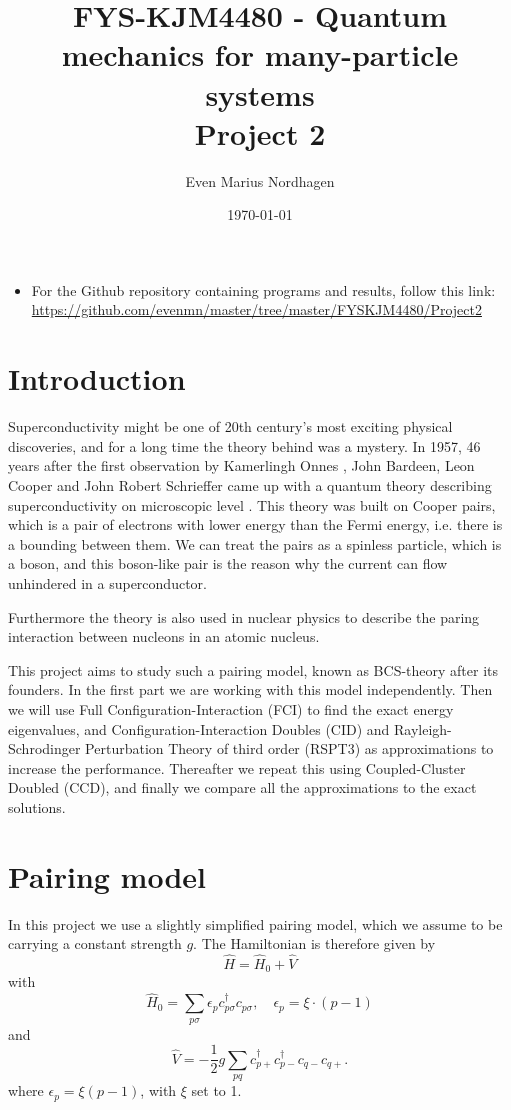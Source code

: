 \documentclass[norsk,a4paper,12pt]{article}
\title{FYS-KJM4480 - Quantum mechanics for many-particle systems \\\vspace{2mm} \Large{Project 2}}
\author{\large Even Marius Nordhagen}
\date\today
\begin{document}
\maketitle

\begin{itemize}
\item For the Github repository containing programs and results, follow this link: 
\url{https://github.com/evenmn/master/tree/master/FYSKJM4480/Project2}
\end{itemize}

\section*{Introduction}
Superconductivity might be one of 20th century's most exciting physical discoveries, and for a long time the theory behind was a mystery. In 1957, 46 years after the first observation by Kamerlingh Onnes \cite {Onnes}, John Bardeen, Leon Cooper and John Robert Schrieffer came up with a quantum theory describing superconductivity on microscopic level \cite {BCS}. This theory was built on Cooper pairs, which is a pair of electrons with lower energy than the Fermi energy, i.e. there is a bounding between them. We can treat the pairs as a spinless particle, which is a boson, and this boson-like pair is the reason why the current can flow unhindered in a superconductor. 

Furthermore the theory is also used in nuclear physics to describe the paring interaction between nucleons in an atomic nucleus. 

This project aims to study such a pairing model, known as BCS-theory after its founders. In the first part we are working with this model independently. Then we will use Full Configuration-Interaction (FCI) to find the exact energy eigenvalues, and Configuration-Interaction Doubles (CID) and Rayleigh-Schrodinger Perturbation Theory of third order (RSPT3) as approximations to increase the performance. Thereafter we repeat this using Coupled-Cluster Doubled (CCD), and finally we compare all the approximations to the exact solutions.
\newpage

\section{Pairing model}
In this project we use a slightly simplified pairing model, which we assume to be carrying a constant strength $g$. The Hamiltonian is therefore given by
\begin{equation}
\hat{H}=\hat{H}_0+\hat{V}
\end{equation}
with
\begin{equation}
\hat{H}_0=\sum_{p\sigma}\epsilon_pc_{p\sigma}^{\dagger}c_{p\sigma},\quad \epsilon_p=\xi\cdot(p-1)
\label{eq:H0_init}
\end{equation}
and
\begin{equation}
\hat{V}=-\frac{1}{2}g\sum_{pq}c_{p+}^{\dagger}c_{p-}^{\dagger}c_{q-}c_{q+}.
\label{eq:V_init}
\end{equation}
where $\epsilon_p=\xi(p-1)$, with $\xi$ set to 1.
\end{document}
